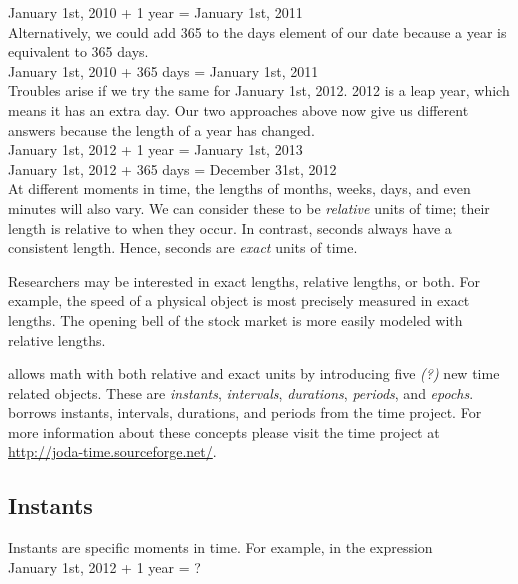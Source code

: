 \documentclass[article]{jss}
\begin{document}
January 1st, 2010 + 1 year = January 1st, 2011\\

Alternatively, we could add 365 to the days element of our date because a year is equivalent to 365 days. \\

January 1st, 2010 + 365 days = January 1st, 2011\\

Troubles arise if we try the same for January 1st, 2012. 2012 is a leap year, which means it has an extra day. Our two approaches above now give us different answers because the length of a year has changed.\\ 

January 1st, 2012 + 1 year = January 1st, 2013\\
January 1st, 2012 + 365 days = December 31st,  2012\\

At different moments in time, the lengths of months, weeks, days, and even minutes will also vary. We can consider these to be \emph{relative} units of time; their length is relative to when they occur. In contrast, seconds always have a consistent length. Hence, seconds are \emph{exact} units of time.

Researchers may be interested in exact lengths, relative lengths, or both. For example, the speed of a physical object is most precisely measured in exact lengths. The opening bell of the stock market is more easily modeled with relative lengths.

 allows math with both relative and exact units by introducing five \emph{(?)} new time related objects. These are \emph{instants}, \emph{intervals}, \emph{durations}, \emph{periods}, and \emph{epochs}.   borrows instants, intervals, durations, and periods from the  time project. For more information about these concepts please visit the  time project at  \url{http://joda-time.sourceforge.net/}. 

\subsection{Instants}
\label{sec:instants}

Instants are specific moments in time.  For example, in the expression\\

January 1st, 2012 + 1 year = ?\\
\end{document}
